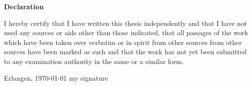 \documentclass[12pt,oneside,reqno,a4paper,twoside]{article}
\begin{document}
\clearpage
\printunsrtglossary[type=abbreviations]


\clearpage
{}
%







\clearpage\thispagestyle{empty}



\begin{center}\textbf{\large Declaration}\end{center}

\noindent
 I hereby certify that I have written this thesis independently
and that I have not used any sources or aids other than those indicated,
that all passages of the work which have been taken over verbatim or in spirit from other sources
from other sources have been marked as such and that the work 
has not yet been submitted to any examination authority in the same or a similar form.


\vspace{4\baselineskip}

\noindent
Erlangen, \today \hspace*{2cm} my signature


\clearpage

\end{document}
